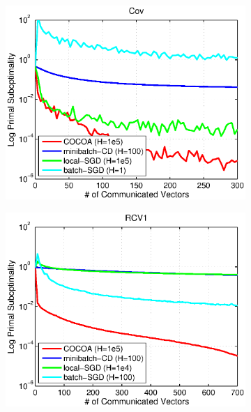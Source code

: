 \documentclass{article} %
\begin{document}
\begin{figure}[H]
\begin{subfigure}{.33\textwidth}
\includegraphics[width=\linewidth]{figs/Cov_Comm.eps}
\end{subfigure}
\begin{subfigure}{.33\textwidth}
\includegraphics[width=\linewidth]{figs/RCV_Comm.eps}
\end{subfigure}
\begin{subfigure}{.33\textwidth}

\end{subfigure}
\end{figure}
\end{document}
